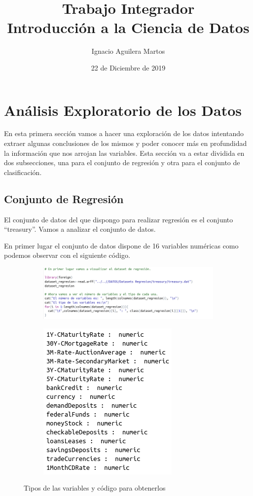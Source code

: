 \documentclass[12pt,a4paper]{article}
\author{Ignacio Aguilera Martos}
\title{Trabajo Integrador \\ Introducción a la Ciencia de Datos}
\date{22 de Diciembre de 2019}
\begin{document}
	\maketitle

	\tableofcontents

	\newpage
	
\section{Análisis Exploratorio de los Datos}

En esta primera sección vamos a hacer una exploración de los datos intentando extraer algunas conclusiones de los mismos y poder conocer más en profundidad la información que nos arrojan las variables. Esta sección va a estar dividida en dos subsecciones, una para el conjunto de regresión y otra para el conjunto de clasificación.

\subsection{Conjunto de Regresión}

El conjunto de datos del que dispongo para realizar regresión es el conjunto ``treasury''. Vamos a analizar el conjunto de datos.

En primer lugar el conjunto de datos dispone de  16 variables numéricas como podemos observar con el siguiente código.

\begin{figure}[H]
	\centering
	\begin{subfigure}{0.47\textwidth}
		\includegraphics[scale=0.35]{./Imagenes/codigo_variables_tipos.png}
	\end{subfigure}
	\begin{subfigure}{0.47\textwidth}
		\includegraphics[scale=0.4]{./Imagenes/variables_tipos.png}
	\end{subfigure}
	\caption{Tipos de las variables y código para obtenerlos}
\end{figure}
\end{document}
